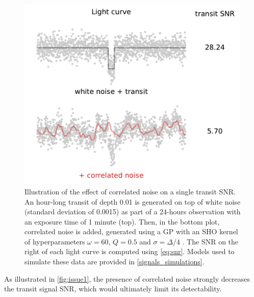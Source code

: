 \documentclass[modern]{aastex631}
\begin{document}
\begin{figure}[H]
    \begin{centering}
        \includegraphics[width=0.6\linewidth]{../workflows/plot_issues/figures/issue1.pdf}
        \caption{Illustration of the effect of correlated noise on a single transit SNR. An hour-long transit of depth 0.01 is generated on top of white noise (standard deviation of 0.0015) as part of a 24-hours observation with an exposure time of 1 minute (top). Then, in the bottom plot, correlated noise is added, generated using a GP with an SHO kernel of hyperparameters $\omega=60$, $Q=0.5$ and $\sigma=\Delta/4$ . The SNR on the right of each light curve is computed using \autoref{eq:snr}. Models used to simulate these data are provided in \autoref{signals_simulations}.}
        \label{fig:issue1}
    \end{centering}
\end{figure}

As illustrated in \autoref{fig:issue1}, the presence of correlated noise strongly decreases the transit signal SNR, which would ultimately limit its detectability.
\end{document}
